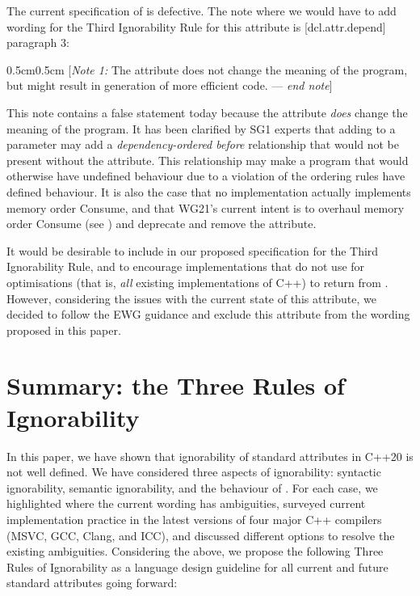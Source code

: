The current specification of  is defective. The note where we would have to add wording for the Third Ignorability Rule for this attribute is [dcl.attr.depend] paragraph 3:
\begin{adjustwidth}{0.5cm}{0.5cm}
[\emph{Note 1:} The  attribute does not change the meaning of the program, but might result in generation of more efficient code. --- \emph{end note}]
\end{adjustwidth}
This note contains a false statement today because the attribute \emph{does} change the meaning of the program. It has been clarified by SG1 experts that adding  to a parameter may add a \emph{dependency-ordered before} relationship that would not be present without the attribute. This relationship may make a program that would otherwise have undefined behaviour due to a violation of the ordering rules have defined behaviour. It is also the case that no implementation actually implements memory order Consume, and that WG21's current intent is to overhaul memory order Consume (see \cite{P0750R1}) and deprecate and remove the  attribute.

It would be desirable to include  in our proposed specification for the Third Ignorability Rule, and to encourage implementations that do not use  for optimisations (that is, \emph{all} existing implementations of C++) to return  from . However, considering the issues with the current state of this attribute, we decided to follow the EWG guidance and exclude this attribute from the wording proposed in this paper.

\section{Summary: the Three Rules of Ignorability}

In this paper, we have shown that ignorability of standard attributes in C++20 is not well defined. We have considered three aspects of ignorability: syntactic ignorability, semantic ignorability, and the behaviour of . For each case, we highlighted where the current wording has ambiguities, surveyed current implementation practice in the latest versions of four major C++ compilers (MSVC, GCC, Clang, and ICC), and discussed different options to resolve the existing ambiguities. Considering the above, we propose the following Three Rules of Ignorability as a language design guideline for all current and future standard attributes going forward:

